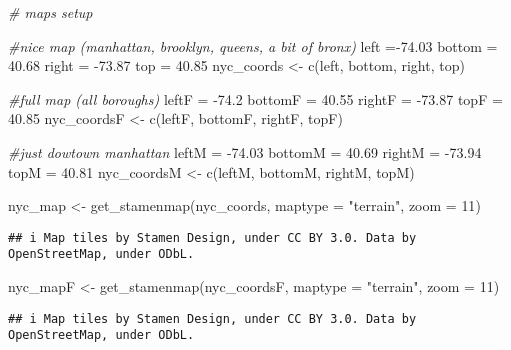 \documentclass[
]{article}
\newenvironment{Shaded}{\begin{snugshade}}{\end{snugshade}}
\newcommand{\AttributeTok}[1]{\textcolor[rgb]{0.77,0.63,0.00}{#1}}
\newcommand{\CommentTok}[1]{\textcolor[rgb]{0.56,0.35,0.01}{\textit{#1}}}
\newcommand{\DecValTok}[1]{\textcolor[rgb]{0.00,0.00,0.81}{#1}}
\newcommand{\FloatTok}[1]{\textcolor[rgb]{0.00,0.00,0.81}{#1}}
\newcommand{\FunctionTok}[1]{\textcolor[rgb]{0.00,0.00,0.00}{#1}}
\newcommand{\NormalTok}[1]{#1}
\newcommand{\OtherTok}[1]{\textcolor[rgb]{0.56,0.35,0.01}{#1}}
\newcommand{\SpecialCharTok}[1]{\textcolor[rgb]{0.00,0.00,0.00}{#1}}
\newcommand{\StringTok}[1]{\textcolor[rgb]{0.31,0.60,0.02}{#1}}
\begin{document}
\begin{Shaded}
\begin{Highlighting}[]
\CommentTok{\# maps setup}

\CommentTok{\#nice map (manhattan, brooklyn, queens, a bit of bronx)}
\NormalTok{left }\OtherTok{=}\SpecialCharTok{{-}}\FloatTok{74.03} 
\NormalTok{bottom }\OtherTok{=} \FloatTok{40.68} 
\NormalTok{right }\OtherTok{=} \SpecialCharTok{{-}}\FloatTok{73.87}
\NormalTok{top }\OtherTok{=} \FloatTok{40.85}
\NormalTok{nyc\_coords }\OtherTok{\textless{}{-}} \FunctionTok{c}\NormalTok{(left, bottom, right, top)}

\CommentTok{\#full map (all boroughs)}
\NormalTok{leftF }\OtherTok{=} \SpecialCharTok{{-}}\FloatTok{74.2}
\NormalTok{bottomF }\OtherTok{=} \FloatTok{40.55}
\NormalTok{rightF }\OtherTok{=} \SpecialCharTok{{-}}\FloatTok{73.87}
\NormalTok{topF }\OtherTok{=} \FloatTok{40.85}
\NormalTok{nyc\_coordsF }\OtherTok{\textless{}{-}} \FunctionTok{c}\NormalTok{(leftF, bottomF, rightF, topF)}

\CommentTok{\#just dowtown manhattan}
\NormalTok{leftM }\OtherTok{=} \SpecialCharTok{{-}}\FloatTok{74.03}
\NormalTok{bottomM }\OtherTok{=} \FloatTok{40.69}
\NormalTok{rightM }\OtherTok{=} \SpecialCharTok{{-}}\FloatTok{73.94}
\NormalTok{topM }\OtherTok{=} \FloatTok{40.81}
\NormalTok{nyc\_coordsM }\OtherTok{\textless{}{-}} \FunctionTok{c}\NormalTok{(leftM, bottomM, rightM, topM)}

\NormalTok{nyc\_map }\OtherTok{\textless{}{-}} \FunctionTok{get\_stamenmap}\NormalTok{(nyc\_coords, }\AttributeTok{maptype =} \StringTok{"terrain"}\NormalTok{, }\AttributeTok{zoom =} \DecValTok{11}\NormalTok{)}
\end{Highlighting}
\end{Shaded}

\begin{verbatim}
## i Map tiles by Stamen Design, under CC BY 3.0. Data by OpenStreetMap, under ODbL.
\end{verbatim}

\begin{Shaded}
\begin{Highlighting}[]
\NormalTok{nyc\_mapF }\OtherTok{\textless{}{-}} \FunctionTok{get\_stamenmap}\NormalTok{(nyc\_coordsF, }\AttributeTok{maptype =} \StringTok{"terrain"}\NormalTok{, }\AttributeTok{zoom =} \DecValTok{11}\NormalTok{)}
\end{Highlighting}
\end{Shaded}

\begin{verbatim}
## i Map tiles by Stamen Design, under CC BY 3.0. Data by OpenStreetMap, under ODbL.
\end{verbatim}
\end{document}
